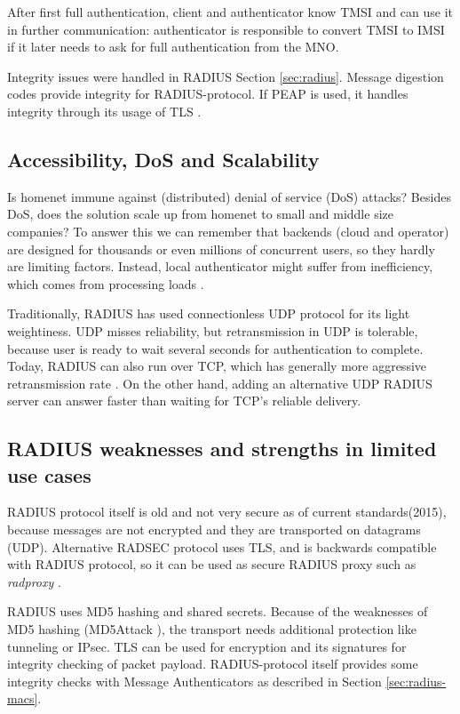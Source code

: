 \documentclass[12pt,a4paper,english]{tutthesis}
\begin{document}
After first full authentication, client and authenticator 
know TMSI and can use it in further communication: authenticator 
is responsible to convert TMSI to IMSI if it later needs to 
ask for full authentication from the MNO.







Integrity issues were handled in RADIUS Section \ref{sec:radius}.
Message digestion codes provide integrity for RADIUS-protocol.
If PEAP is used, it handles integrity through its usage of TLS \cite{peap}.

\subsection{Accessibility, DoS and Scalability}
\label{sec-6-5-1}
Is homenet immune against (distributed) denial of service (DoS)
attacks? Besides DoS, does the solution scale up from homenet to
small and middle size companies?
To answer this we can remember that backends (cloud and operator) are
designed for thousands or even millions of concurrent users, so 
they hardly are limiting factors. Instead, local
authenticator might suffer from inefficiency, which
comes from processing loads \cite{2009-lin-simefficiency}.


Traditionally, RADIUS has used connection\-less UDP protocol for its
light weightiness. UDP misses reliability, but retransmission in UDP is
tolerable, because user is ready to wait several seconds for
authentication to complete. Today, RADIUS can also run over TCP, which
has generally more aggressive retransmission
rate \cite[Section 2.2.1]{rfc5080}. On the other hand, adding an
alternative UDP RADIUS server can answer faster than waiting for TCP's reliable delivery.


\subsection{RADIUS weaknesses and strengths in limited use cases}
\label{sec-6-5-2}


RADIUS protocol itself is old and not very secure as of current
standards(2015), because messages are not encrypted and they are
transported on datagrams (UDP). Alternative RADSEC protocol uses TLS, and 
is backwards compatible with RADIUS protocol, so it can be used
as secure RADIUS proxy such as \emph{radproxy} \cite{uninett-radproxy}.

RADIUS uses MD5 hashing and shared secrets. Because of the weaknesses of
MD5 hashing (MD5Attack \cite{rfc5176}), the transport needs additional
protection like tunneling or IPsec. TLS can be used for encryption and
its signatures for integrity checking of packet payload.
RADIUS-protocol itself provides some integrity checks with Message
Authenticators as described in Section \ref{sec:radius-macs}.
\end{document}
